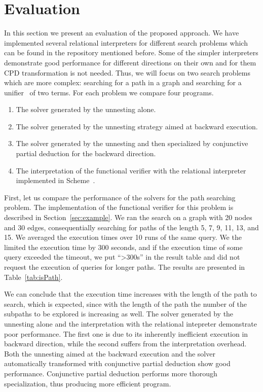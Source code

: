 \section{Evaluation}
\label{sec:eva}

In this section we present an evaluation of the proposed approach. 
We have implemented several relational interpreters for different search problems which can be found in the repository mentioned before. 
Some of the simpler interpreters demonstrate good performance for different directions on their own and for them CPD transformation is not needed. 
Thus, we will focus on two search problems which are more complex: searching for a path in a graph and searching for a unifier~\cite{lozov:unification} of two terms. 
For each problem we compare four programs.
\begin{enumerate}
    \item The solver generated by the unnesting alone.
    \item The solver generated by the unnesting strategy aimed at backward execution. 
    \item The solver generated by the unnesting and then specialized by conjunctive partial deduction for the backward direction.
    \item The interpretation of the functional verifier with the relational interpreter implemented in Scheme~\cite{lozov:seven}. 
\end{enumerate}

First, let us compare the performance of the solvers for the path searching problem.
The implementation of the functional verifier for this problem is described in Section~\ref{sec:example}. 
We ran the search on a graph with 20 nodes and 30 edges, consequentially
 searching for paths of the length 5, 7, 9, 11, 13, and 15. 
We averaged the execution times over 10 runs of the same query. 
We the limited the execution time by 300 seconds, and if the execution time of some query exceeded the timeout, we put ``>300s'' in the result table and did not request the execution of queries for longer paths. The results are presented in Table~\ref{tab:isPath}. 

We can conclude that the execution time increases with the length of the path to search, which is expected, since with the length of the path the number of the subpaths to be explored is increasing as well.
The solver generated by the unnesting alone and the interpretation with the relational intepreter demonstrate poor performance. 
The first one is due to its inherently inefficient execution in backward direction, while the second suffers from the interpretation overhead. 
Both the unnesting aimed at the backward execution and the solver automatically transformed with conjunctive partial deduction show good performance. 
Conjunctive partial deduction performs more thorough specialization, thus producing more efficient program. 

